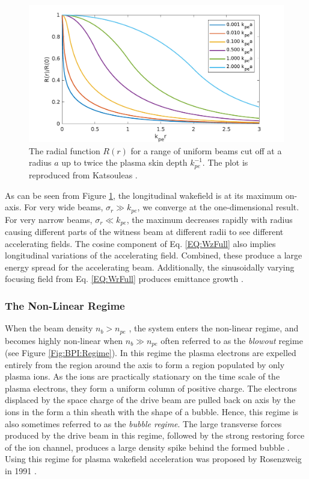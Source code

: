 \begin{figure}[hbt]
    \centering
    \includegraphics[width=0.8125\linewidth,trim={0mm 0mm 0mm 0mm},clip]{figures/RepKatsouleas1987}
    \caption{\label{Fig:BPI:Kat87} The radial function $R(r)$ for a range of uniform beams cut off at a radius $a$ up to twice the plasma skin depth $k_{pe}^{-1}$. The plot is reproduced from Katsouleas \etal \cite{katsouleas:1987}.}
\end{figure}

As can be seen from Figure \ref{Fig:BPI:Kat87}, the longitudinal wakefield is at its maximum on-axis. For very wide beams, $\sigma_{r} \gg k_{pe}$, we converge at the one-dimensional result. For very narrow beams, $\sigma_{r} \ll k_{pe}$, the maximum decreases rapidly with radius causing different parts of the witness beam at different radii to see different accelerating fields. The cosine component of Eq. \ref{EQ:WzFull} also implies longitudinal variations of the accelerating field. Combined, these produce a large energy spread for the accelerating beam. Additionally, the sinusoidally varying focusing field from Eq. \ref{EQ:WrFull} produces emittance growth \cite{muggli:2017,katsouleas:1987}.

\subsubsection{The Non-Linear Regime}
\label{Int:BPI:NLin}

When the beam density $n_{b} > n_{pe}$ , the system enters the non-linear regime, and becomes highly non-linear when $n_{b} \gg n_{pe}$ \dash often referred to as the \textit{blowout} regime (see Figure \ref{Fig:BPI:Regime}). In this regime the plasma electrons are expelled entirely from the region around the axis to form a region populated by only plasma ions. As the ions are practically stationary on the time scale of the plasma electrons, they form a uniform column of positive charge. The electrons displaced by the space charge of the drive beam are pulled back on axis by the ions in the form a thin sheath with the shape of a bubble. Hence, this regime is also sometimes referred to as the \textit{bubble regime}. The large transverse forces produced by the drive beam in this regime, followed by the strong restoring force of the ion channel, produces a large density spike behind the formed bubble \cite{dawson:1959,rosenzweig:1991}. Using this regime for plasma wakefield acceleration was proposed by Rosenzweig \etal in 1991 \cite{rosenzweig:1991}.

